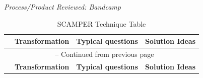 \begin{center}
    \textit{Process/Product Reviewed: Bandcamp}
\end{center}
\vspace{-1em}
\begin{longtable}{|c|p{3cm}|p{4.5cm}|p{4.5cm}|}
\caption{\centering SCAMPER Technique Table}
\label{tab:my_table}\\
\hline
\textbf{} & \textbf{Transformation} & \textbf{Typical questions} & \textbf{Solution Ideas} \\
\hline
\endfirsthead
\multicolumn{4}{c}{{\tablename\ \thetable{} -- Continued from previous page}} \\
\hline
\textbf{} & \textbf{Transformation} & \textbf{Typical questions} & \textbf{Solution Ideas} \\
\hline
\endhead


\end{longtable}
